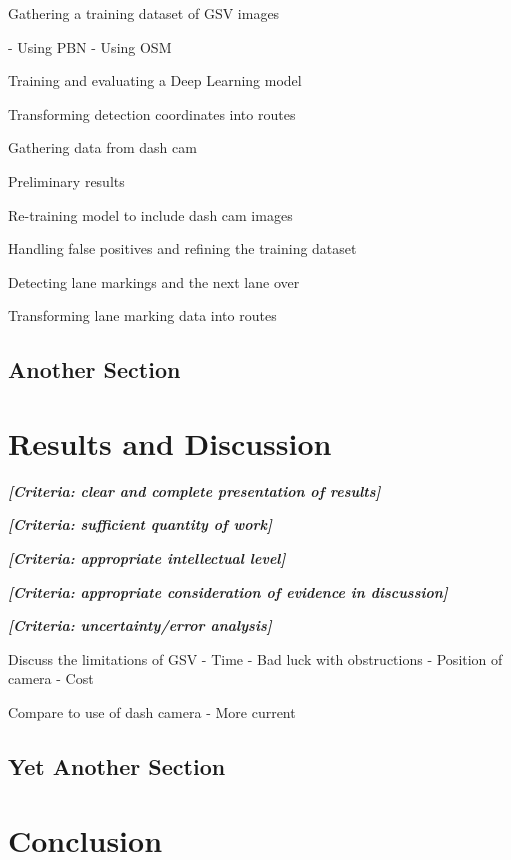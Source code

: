 \documentclass[11pt,twoside]{report}
\newcommand{\remark}[1]{{\bf \em [\marginpar{$\Leftarrow$}#1]}}
\begin{document}
Gathering a training dataset of GSV images

- Using PBN
- Using OSM

Training and evaluating a Deep Learning model

Transforming detection coordinates into routes

Gathering data from dash cam

Preliminary results

Re-training model to include dash cam images

Handling false positives and refining the training dataset

Detecting lane markings and the next lane over

Transforming lane marking data into routes


\section{Another Section}

\chapter{Results and Discussion}

\remark{Criteria: clear and complete presentation of results}

\remark{Criteria: sufficient quantity of work}

\remark{Criteria: appropriate intellectual level}

\remark{Criteria: appropriate consideration of evidence in discussion}

\remark{Criteria: uncertainty/error analysis}

Discuss the limitations of GSV
- Time
- Bad luck with obstructions
- Position of camera
- Cost

Compare to use of dash camera
- More current

\section{Yet Another Section}

\chapter{Conclusion}
\end{document}
